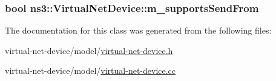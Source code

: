 \subsubsection[{\texorpdfstring{m\+\_\+supports\+Send\+From}{m_supportsSendFrom}}]{\setlength{\rightskip}{0pt plus 5cm}bool ns3\+::\+Virtual\+Net\+Device\+::m\+\_\+supports\+Send\+From\hspace{0.3cm}{\ttfamily [private]}}\hypertarget{classns3_1_1VirtualNetDevice_aac37389af138f3fae76a3219f9e69869}{}\label{classns3_1_1VirtualNetDevice_aac37389af138f3fae76a3219f9e69869}


The documentation for this class was generated from the following files\+:\begin{DoxyCompactItemize}
\item 
virtual-\/net-\/device/model/\hyperlink{virtual-net-device_8h}{virtual-\/net-\/device.\+h}\item 
virtual-\/net-\/device/model/\hyperlink{model_2virtual-net-device_8cc}{virtual-\/net-\/device.\+cc}\end{DoxyCompactItemize}
